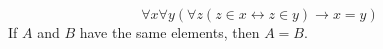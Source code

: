 \guard




\begin{defn}
\label{defn:extensionality}
  \[ \forall x\forall y(\forall z(z\in x\leftrightarrow z\in y)\rightarrow x=y) \]
  If $A$ and $B$ have the same elements, then $A=B$.
\end{defn}
